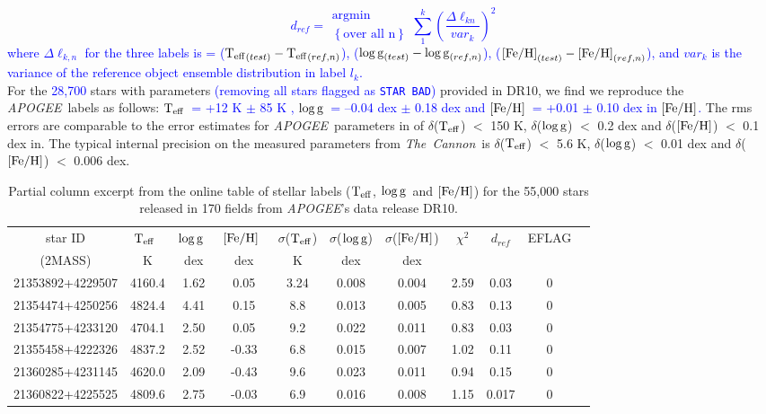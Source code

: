 \documentclass[12pt, preprint]{aastex}
\newcommand{\tc}{\textsl{The~Cannon}}
\newcommand{\apogee}{\textsl{APOGEE}}
\newcommand{\badstar}{\texttt{STAR BAD}}
\newcommand{\teff}{\mbox{$\rm T_{eff}$}}
\newcommand{\feh}{\mbox{$\rm [Fe/H]$}}
\newcommand{\logg}{\mbox{$\rm \log g$}}
\begin{document}
\textcolor{blue}{
\begin{equation}
d_{{ref}} =  \substack{\mbox{argmin}\\{\left\{{\mbox{over all n}}\right\}}}
\sum_{1}^{k}
\left( \frac{\Delta \ell_{kn}}{var_k}\right)^2
 \label{eq:dist}
\end{equation}
}
\textcolor{blue}{where $\Delta \ell_{k,n} $ for the three labels is = ($\teff_{(test)} - \teff_{(ref,n)}$), ($\logg_{(test)} - \logg_{(ref,n)}$), ($\feh_{(test)} - \feh_{(ref,n)}$), 
and $var_k$ is the variance of the reference object ensemble distribution in label $l_k$.} \\

For the \textcolor{blue}{28,700} stars with parameters \textcolor{blue}{(removing all stars flagged as \badstar)} provided in DR10, we find we reproduce the \apogee\ labels as follows: 
\textcolor{blue}{\teff\ = +12 K $\pm$ 85 K , \logg\ = --0.04 dex $\pm$ 0.18 dex and \feh\ = +0.01 $\pm$ 0.10 dex in \feh. }
The rms errors are comparable to the error estimates for \apogee\ parameters in \citet{Meszaros2013} 
of $\delta$(\teff) $<$ 150 K, $\delta$(\logg) $<$ 0.2 dex and $\delta$(\feh) $<$ 0.1 dex in. 
The typical internal precision on the measured parameters from \tc\ is $\delta$(\teff) $<$ 5.6 K, $\delta$(\logg) $<$ 0.01 dex and $\delta$(\feh) $<$ 0.006 dex.

\begin{table}[!h]
\small{
\centering
\caption{Partial column excerpt from the online table of stellar labels (\teff, \logg\ and \feh) for the 55,000 stars released in 170 fields from \apogee 's data release DR10. } 
\begin{tabular}{| c | c | c |  c | c | c |  c | c | c | c | c | } %
\hline
\small{star ID}  & \teff\ & \logg\ & \feh\ & $\sigma$(\teff) & $\sigma$(\logg) & $\sigma$(\feh) & $\chi^2$ & {$d_{ref}$} & \tiny{EFLAG} \\
\small{(2MASS)} & K & dex &  dex  & K & dex & dex &  & &   \\    
\hline
\tiny{21353892+4229507} & 4160.4 & 1.62  & 0.05  & 3.24 & 0.008  & 0.004  & 2.59 & 0.03 & 0 \\
\tiny{21354474+4250256} & 4824.4 & 4.41  & 0.15  & 8.8  & 0.013  & 0.005  & 0.83 & 0.13 & 0 \\
\tiny{21354775+4233120} & 4704.1  & 2.50  & 0.05  & 9.2  & 0.022  & 0.011  & 0.83   & 0.03 & 0\\
\tiny{21355458+4222326} & 4837.2  & 2.52  & -0.33 &  6.8 &  0.015 &  0.007 &  1.02   &  0.11 & 0\\
\tiny{21360285+4231145} & 4620.0  & 2.09  & -0.43 &  9.6 &  0.023 &  0.011 &  0.94   & 0.15 & 0 \\
\tiny{21360822+4225525} & 4809.6  & 2.75  & -0.03 &  6.9 &  0.016 &  0.008 &  1.15   & 0.017 & 0\\
 \hline
\end{tabular}
\label{tab:online} }
\end{table}  
 
\end{document}
